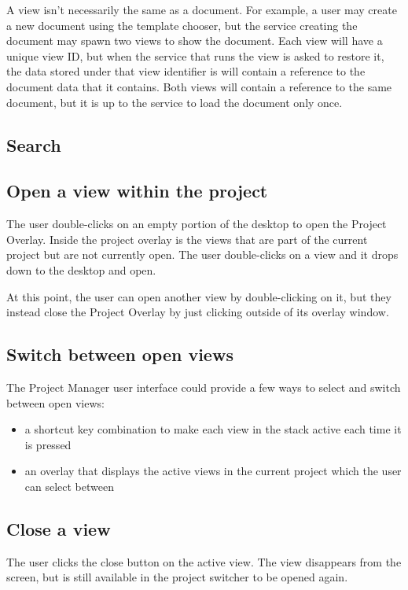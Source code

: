 \documentclass[11pt]{report}
\newcommand{\proman}{Project Manager\xspace}
\begin{document}
A view isn't necessarily the same as a document. For example, a user may create a new document using the template chooser, but the service creating the document may spawn two views to show the document. Each view will have a unique view ID, but when the service that runs the view is asked to restore it, the data stored under that view identifier is will contain a reference to the document data that it contains. Both views will contain a reference to the same document, but it is up to the service to load the document only once.

\subsection{Search}


\subsection{Open a view within the project}
The user double-clicks on an empty portion of the desktop to open the Project Overlay. Inside the project overlay is the views that are part of the current project but are not currently open. The user double-clicks on a view and it drops down to the desktop and open. 

At this point, the user can open another view by double-clicking on it, but they instead close the Project Overlay by just clicking outside of its overlay window.

\subsection{Switch between open views}
The \proman user interface could provide a few ways to select and switch between open views:
\begin{itemize}
\item a shortcut key combination to make each view in the stack active each time it is pressed
\item an overlay that displays the active views in the current project which the user can select between
\end{itemize}

\subsection{Close a view}
The user clicks the close button on the active view. The view disappears from the screen, but is still available in the project switcher to be opened again.
\end{document}
